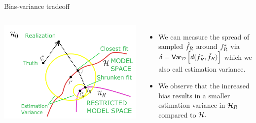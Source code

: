 \documentclass[11pt,compress,t,notes=noshow, xcolor=table]{beamer}
\begin{document}
\begin{vbframe}{Bias-variance tradeoff}
\begin{columns}[onlytextwidth,T]
  \includegraphics[width=1.0\textwidth]{slides/regularization/figure_man/bv_anim_2.pdf}

      \lz 
      \begin{itemize}
          \item We can measure the spread of sampled $\hat{f}_R$ around $f^{\ast}_R$ via $\delta = \mathsf{Var}_{\mathcal{D}}\left[d(f^{\ast}_R, \hat{f}_R)\right]$ which we also call estimation variance.
          \item We observe that the increased bias results in a smaller estimation variance in $\mathcal{H}_R$ compared to $\mathcal{H}.$
      \end{itemize}
    \end{columns}

\end{vbframe}



\endlecture
\end{document}
